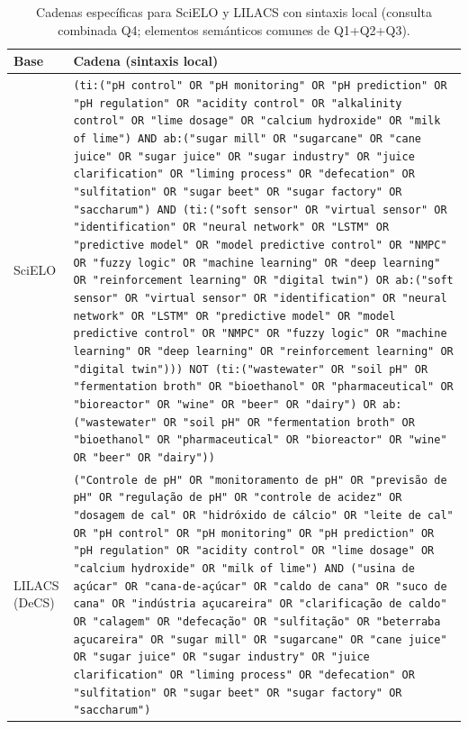 \begin{table}[H]
\centering
\caption{Cadenas específicas para SciELO y LILACS con sintaxis local
(consulta combinada Q4; elementos semánticos comunes de Q1+Q2+Q3).}
\label{tab:scielo_lilacs_syntax}
\singlespacing\scriptsize
\begin{tabular}{p{2.3cm} p{12.2cm}}
\toprule
\textbf{Base} & \textbf{Cadena (sintaxis local)} \\
\midrule
SciELO
  & \texttt{(ti:("pH control" OR "pH monitoring" OR "pH prediction"
     OR "pH regulation" OR "acidity control" OR "alkalinity control"
     OR "lime dosage" OR "calcium hydroxide" OR "milk of lime") AND
     ab:("sugar mill" OR "sugarcane" OR "cane juice" OR "sugar juice"
     OR "sugar industry" OR "juice clarification" OR "liming process"
     OR "defecation" OR "sulfitation" OR "sugar beet" OR "sugar factory"
     OR "saccharum") AND (ti:("soft sensor" OR "virtual sensor" OR
     "identification" OR "neural network" OR "LSTM" OR "predictive model"
     OR "model predictive control" OR "NMPC" OR "fuzzy logic" OR
     "machine learning" OR "deep learning" OR "reinforcement learning"
     OR "digital twin") OR ab:("soft sensor" OR "virtual sensor" OR
     "identification" OR "neural network" OR "LSTM" OR "predictive model"
     OR "model predictive control" OR "NMPC" OR "fuzzy logic" OR
     "machine learning" OR "deep learning" OR "reinforcement learning"
     OR "digital twin"))) NOT (ti:("wastewater" OR "soil pH" OR
     "fermentation broth" OR "bioethanol" OR "pharmaceutical" OR
     "bioreactor" OR "wine" OR "beer" OR "dairy") OR ab:("wastewater"
     OR "soil pH" OR "fermentation broth" OR "bioethanol" OR
     "pharmaceutical" OR "bioreactor" OR "wine" OR "beer" OR "dairy"))} \\
\midrule
LILACS (DeCS)
  & \texttt{("Controle de pH" OR "monitoramento de pH" OR "previsão de pH"
     OR "regulação de pH" OR "controle de acidez" OR "dosagem de cal"
     OR "hidróxido de cálcio" OR "leite de cal" OR "pH control" OR
     "pH monitoring" OR "pH prediction" OR "pH regulation" OR
     "acidity control" OR "lime dosage" OR "calcium hydroxide" OR
     "milk of lime") AND ("usina de açúcar" OR "cana-de-açúcar" OR
     "caldo de cana" OR "suco de cana" OR "indústria açucareira" OR
     "clarificação de caldo" OR "calagem" OR "defecação" OR
     "sulfitação" OR "beterraba açucareira" OR "sugar mill" OR
     "sugarcane" OR "cane juice" OR "sugar juice" OR "sugar industry"
     OR "juice clarification" OR "liming process" OR "defecation" OR
     "sulfitation" OR "sugar beet" OR "sugar factory" OR "saccharum")
}
\end{tabular}
\end{table}
